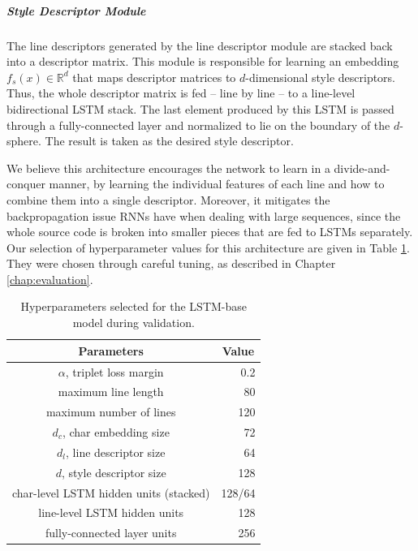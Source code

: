 \subparagraph*{Style Descriptor Module}

The line descriptors generated by the line descriptor module are stacked back into a descriptor matrix. This module is responsible for learning an embedding $f_s(x) \in \mathbb{R}^d$ that maps descriptor matrices to $d$-dimensional style descriptors. Thus, the whole descriptor matrix is fed -- line by line -- to a line-level bidirectional LSTM stack. The last element produced by this LSTM is passed through a fully-connected layer and normalized to lie on the boundary of the $d$-sphere. The result is taken as the desired style descriptor.

We believe this architecture encourages the network to learn in a divide-and-conquer manner, by learning the individual features of each line and how to combine them into a single descriptor. Moreover, it mitigates the backpropagation issue RNNs have when dealing with large sequences, since the whole source code is broken into smaller pieces that are fed to LSTMs separately. Our selection of hyperparameter values for this architecture are given in Table \ref{tab:lstm_hyper}. They were chosen through careful tuning, as described in Chapter \ref{chap:evaluation}.

\begin{table}[htbp]
	\centering
	\begin{tabular}{c|r}
		\hline
		\textbf{Parameters}           & \multicolumn{1}{c}{\textbf{Value}} \\ \hline
		$\alpha$, triplet loss margin   & 0.2                        \\ \hline
		maximum line length   & 80                        \\ \hline
		maximum number of lines   & 120                            \\ \hline
		$d_c$, char embedding size   & 72                           \\ \hline
		$d_l$, line descriptor size  & 64                            \\ \hline
		$d$, style descriptor size & 128                            \\ \hline
		char-level LSTM hidden units (stacked) & 128/64                            \\ \hline
		line-level LSTM hidden units & 128                            \\ \hline
		fully-connected layer units  & 256                            \\ \hline
	\end{tabular}
	\caption{Hyperparameters selected for the LSTM-base model during validation.}
	\label{tab:lstm_hyper}
\end{table}


